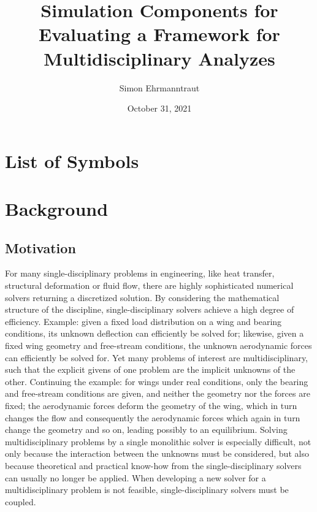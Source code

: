 \documentclass[10pt, ngerman, english,
twoside, open=right,
numbers=noenddot,
declaration=section,
abstract=section,
abstract=multiple,
abstract=notoc,
declaration=notoc,
cd=pale, 
chapterprefix=off, 
chapterpage=false, 
headingsvskip=-10em,
cdgeometry=custom, 
slantedgreek=on,
cdmath=on, 
cdfont=on,
ttfont=false,
mathswap=off,
]{tudscrreprt}
\institute{Institute of Fluid Mechanics}
\date{October 31, 2021}
\author{Simon Ehrmanntraut}
\title{Simulation Components for Evaluating a Framework for Multidisciplinary Analyzes}
\numberwithin{equation}{chapter}
\newcommand{\sidenote}[1]{
  \leavevmode %
  \marginpar{\hyphenpenalty=1000 \flushleft{\textcolor{HKS41}{#1}}}}
\begin{document}
\makecover[cdgeometry=on]
\maketitle[cdgeometry=on]
\cleardoublepage
\thispagestyle{empty}

\cleardoublepage

\cleardoublepage
{}
\tableofcontents
\chapter*{List of Symbols}

\chapter{Background}
\setcounter{page}{1}
\section{Motivation}
\sidenote{Single- and Multidisciplinary Problems}For many single-disciplinary problems in engineering, like heat transfer, structural deformation or fluid flow, there are highly sophisticated numerical solvers returning a discretized solution. By considering the mathematical structure of the discipline, single-disciplinary solvers achieve a high degree of efficiency.
Example: given a fixed load distribution on a wing and bearing conditions, its unknown deflection can efficiently be solved for; likewise, given a fixed wing geometry and free-stream conditions, the unknown aerodynamic forces can efficiently be solved for.
Yet many problems of interest are multidisciplinary, such that the explicit givens of one problem are the implicit unknowns of the other.
Continuing the example: for wings under real conditions, only the bearing and free-stream conditions are given, and neither the geometry nor the forces are fixed; the aerodynamic forces deform the geometry of the wing, which in turn changes the flow and consequently the aerodynamic forces which again in turn change the geometry and so on, leading possibly to an equilibrium.
Solving multidisciplinary problems by a single monolithic solver is especially difficult, not only because the interaction between the unknowns must be considered, but also because theoretical and practical know-how from the single-disciplinary solvers can usually no longer be applied. When developing a new solver for a multidisciplinary problem is not feasible, single-disciplinary solvers must be coupled.\par
\end{document}
